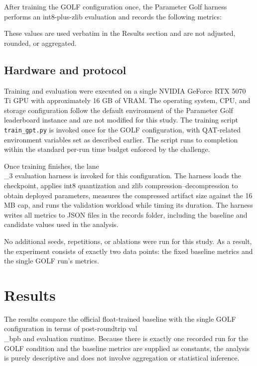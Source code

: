 \documentclass{article}
\begin{document}
After training the GOLF configuration once, the Parameter Golf harness performs an int8-plus-zlib evaluation and records the following metrics:

\begin{itemize}

\end{itemize}

These values are used verbatim in the Results section and are not adjusted, rounded, or aggregated.

\subsection{Hardware and protocol}

\label{sec:hardware_and_protocol}

Training and evaluation were executed on a single NVIDIA GeForce RTX 5070 Ti GPU with approximately 16 GB of VRAM. The operating system, CPU, and storage configuration follow the default environment of the Parameter Golf leaderboard instance and are not modified for this study. The training script \texttt{train\_gpt.py} is invoked once for the GOLF configuration, with QAT-related environment variables set as described earlier. The script runs to completion within the standard per-run time budget enforced by the challenge.

Once training finishes, the lane\\_3 evaluation harness is invoked for this configuration. The harness loads the checkpoint, applies int8 quantization and zlib compression--decompression to obtain deployed parameters, measures the compressed artifact size against the 16 MB cap, and runs the validation workload while timing its duration. The harness writes all metrics to JSON files in the records folder, including the baseline and candidate values used in the analysis.

No additional seeds, repetitions, or ablations were run for this study. As a result, the experiment consists of exactly two data points: the fixed baseline metrics and the single GOLF run's metrics.

\section{Results}

\label{sec:results}

The results compare the official float-trained baseline with the single GOLF configuration in terms of post-roundtrip val\\_bpb and evaluation runtime. Because there is exactly one recorded run for the GOLF condition and the baseline metrics are supplied as constants, the analysis is purely descriptive and does not involve aggregation or statistical inference.
\end{document}
